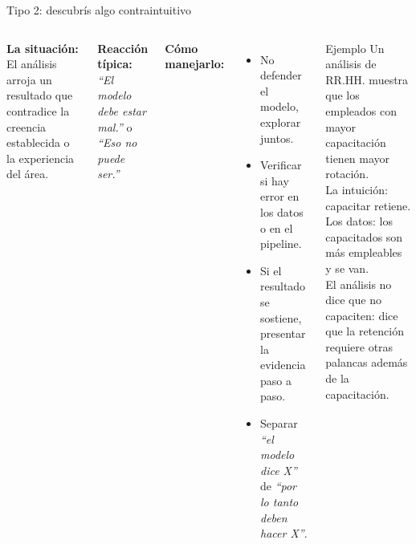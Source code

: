 \documentclass[aspectratio=169]{beamer}
\begin{document}
\begin{frame}{Tipo 2: descubrís algo contraintuitivo}
  \begin{columns}
      \textbf{La situación:}\\
      El análisis arroja un resultado que contradice la creencia establecida o la experiencia del área.

      \bigskip
      \textbf{Reacción típica:}\\
      \textit{``El modelo debe estar mal.''} o \textit{``Eso no puede ser.''}

      \bigskip
      \textbf{Cómo manejarlo:}
      \begin{itemize}
        \item No defender el modelo, explorar juntos.
        \item Verificar si hay error en los datos o en el pipeline.
        \item Si el resultado se sostiene, presentar la evidencia paso a paso.
        \item Separar \textit{``el modelo dice X''} de \textit{``por lo tanto deben hacer X''}.
      \end{itemize}
      \begin{exampleblock}{Ejemplo}
        Un análisis de RR.HH. muestra que los empleados con mayor capacitación tienen mayor rotación.\\
        \bigskip
        La intuición: capacitar retiene. Los datos: los capacitados son más empleables y se van.\\
        \bigskip
        El análisis no dice que no capaciten: dice que la retención requiere otras palancas además de la capacitación.
      \end{exampleblock}
  \end{columns}
\end{frame}
\end{document}
